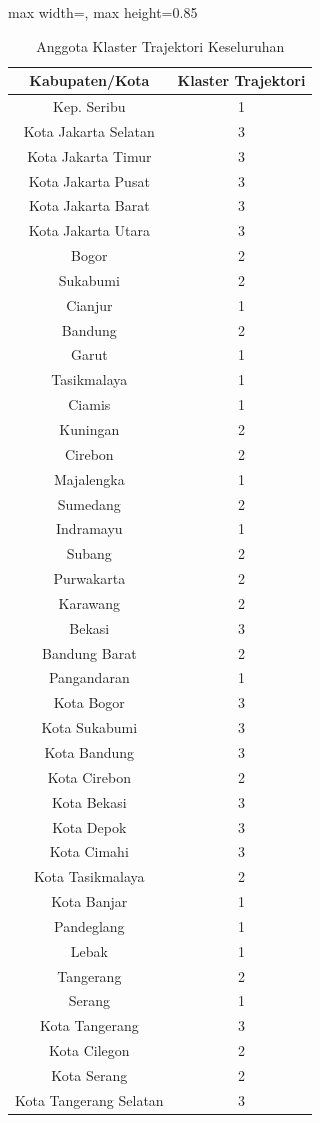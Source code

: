 \begin{table}[H]
\centering
\caption{Anggota Klaster Trajektori Keseluruhan} \label{tab:clustermembers}
\begin{adjustbox}{max width=\textwidth, max height=0.85\textheight}
\begin{tabular}{|c|c|}
\hline
\textbf{Kabupaten/Kota} & \textbf{Klaster Trajektori} \\
\hline
Kep. Seribu & 1 \\
Kota Jakarta Selatan & 3 \\
Kota Jakarta Timur & 3 \\
Kota Jakarta Pusat & 3 \\
Kota Jakarta Barat & 3 \\
Kota Jakarta Utara & 3 \\
Bogor & 2 \\
Sukabumi & 2 \\
Cianjur & 1 \\
Bandung & 2 \\
Garut & 1 \\
Tasikmalaya & 1 \\
Ciamis & 1 \\
Kuningan & 2 \\
Cirebon & 2 \\
Majalengka & 1 \\
Sumedang & 2 \\
Indramayu & 1 \\
Subang & 2 \\
Purwakarta & 2 \\
Karawang & 2 \\
Bekasi & 3 \\
Bandung Barat & 2 \\
Pangandaran & 1 \\
Kota Bogor & 3 \\
Kota Sukabumi & 3 \\
Kota Bandung & 3 \\
Kota Cirebon & 2 \\
Kota Bekasi & 3 \\
Kota Depok & 3 \\
Kota Cimahi & 3 \\
Kota Tasikmalaya & 2 \\
Kota Banjar & 1 \\
Pandeglang & 1 \\
Lebak & 1 \\
Tangerang & 2 \\
Serang & 1 \\
Kota Tangerang & 3 \\
Kota Cilegon & 2 \\
Kota Serang & 2 \\
Kota Tangerang Selatan & 3 \\
\hline
\end{tabular}
\end{adjustbox}
\end{table}